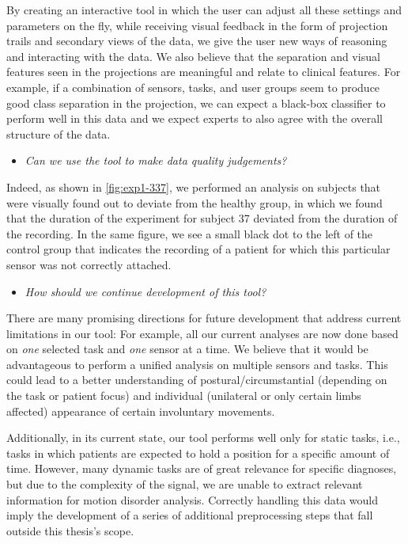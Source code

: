 By creating an interactive tool in which the user can adjust all these settings and parameters on the fly, while receiving visual feedback in the form of projection trails and secondary views of the data, we give the user new ways of reasoning and interacting with the data. We also believe that the separation and visual features seen in the projections are meaningful and relate to clinical features. For example, if a combination of sensors, tasks, and user groups seem to produce good class separation in the projection, we can expect a black-box classifier to perform well in this data \citep{rauber_aid} and we expect experts to also agree with the overall structure of the data.


\begin{itemize}
  \item \emph{Can we use the tool to make data quality judgements?}
\end{itemize}
Indeed, as shown in \cref{fig:exp1-337}, we performed an analysis on subjects that were visually found out to deviate from the healthy group, in which we found that the duration of the experiment for subject 37 deviated from the duration of the recording. In the same figure, we see a small black dot to the left of the control group that indicates the recording of a patient for which this particular sensor was not correctly attached. 

\begin{itemize}
  \item \emph{How should we continue development of this tool?}
\end{itemize}
There are many promising directions for future development that address current limitations in our tool: For example, all our current analyses are now done based on \emph{one} selected task and \emph{one} sensor at a time. We believe that it would be advantageous to perform a unified analysis on multiple sensors and tasks. This could lead to a better understanding of postural/circumstantial (depending on the task or patient focus) and individual (unilateral or only certain limbs affected) appearance of certain involuntary movements.

Additionally, in its current state, our tool performs well only for static tasks, i.e., tasks in which patients are expected to hold a position for a specific amount of time. However, many dynamic tasks are of great relevance for specific diagnoses, but due to the complexity of the signal, we are unable to extract relevant information for motion disorder analysis. Correctly handling this data would imply the development of a series of additional preprocessing steps that fall outside this thesis's scope.

